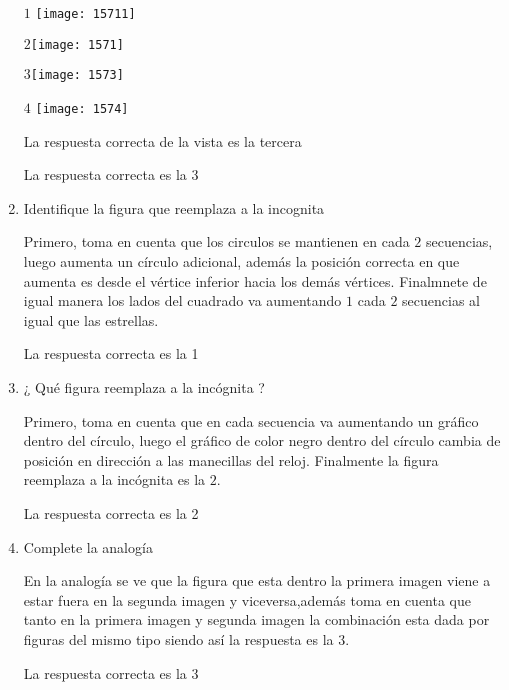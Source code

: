 \documentclass[11pt, a4paper]{article} %
\theoremstyle{dotlessP}
\theoremstyle{dotlessS}
\begin{document}
\begin{enumerate}[label=\color{dg}\theenumi.]
  {\color{dh}
\(1\) \texttt{[image: 15711]}

\(2\)\texttt{[image: 1571]}

\(3\)\texttt{[image: 1573]}

\(4\) \texttt{[image: 1574]} }

La respuesta correcta de la vista es la tercera 

{\color{dh}La respuesta correcta es la 3}


\item{\color{db}Identifique la figura que reemplaza a la incognita}

Primero, toma en cuenta que los circulos se mantienen en cada \(2\) secuencias, luego aumenta un círculo adicional, además la posición correcta en que aumenta es desde el vértice inferior hacia los demás vértices. Finalmnete de igual manera los lados del cuadrado va aumentando \(1\) cada \(2\) secuencias al igual que las estrellas.

{\color{dh}La respuesta correcta es la 1} 

  \item{\color{db}¿ Qué figura reemplaza a la incógnita ?}
  
   Primero, toma en cuenta que en cada secuencia va aumentando un gráfico dentro del círculo, luego el gráfico de color negro dentro del círculo cambia de posición en dirección a las manecillas del reloj. Finalmente la figura reemplaza a la incógnita es la \(2\).
  
 {\color{dh}La respuesta correcta es la 2}
  \item{\color{db}Complete la analogía}
        
        En la analogía se ve que la figura que esta dentro la primera imagen viene a estar fuera en la segunda imagen y viceversa,además toma en cuenta que tanto en la primera imagen y segunda imagen la combinación esta dada por figuras del mismo tipo siendo así la respuesta es la \(3\).
        
        {\color{dh}La respuesta correcta es la 3}
        
        
        \end{enumerate}
        















\end{document}
